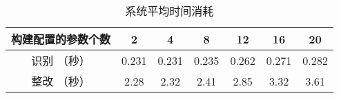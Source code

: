 \begin{table}[!ht]
\caption{系统平均时间消耗}
\label{tab:fix_time}
\centering
\begin{threeparttable}
\begin{tabular}{c|cccccc}
        \toprule[1.5pt]
        {构建配置的参数个数} & {2} & {4} & {8} & {12} & {16} & {20}  \\
        \midrule[0.8pt]
        {识别 （秒）} & 0.231 & 0.231 & 0.235 & 0.262 & 0.271 & 0.282 \\
        {整改 （秒）}  & 2.28 & 2.32 & 2.41 & 2.85 & 3.32 & 3.61 \\
        \bottomrule[1.5pt]
\end{tabular}
\end{threeparttable}
\end{table}